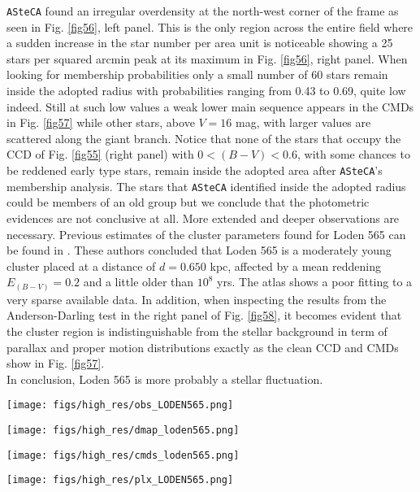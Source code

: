 \documentclass{aa}
\begin{document}
\texttt{ASteCA} found an irregular overdensity at the north-west corner of the
frame as seen in Fig. \ref{fig56}, left panel. This is the only region across the
entire field where a sudden increase in the star number per area unit is
noticeable showing a 25 stars per squared arcmin peak at its maximum in Fig. 
\ref{fig56}, right panel.
When looking for membership probabilities only a small number of 60 stars remain
inside the adopted radius with probabilities ranging from 0.43 to 0.69, quite
low indeed. Still at such low values a weak lower main sequence appears in the
CMDs in Fig. \ref{fig57} while other stars, above $V = 16$ mag, with larger
values are scattered along the giant branch. Notice that none of the stars that
occupy the CCD of Fig. \ref{fig55} (right panel) with $0<(B-V)<0.6$, with some
chances to be reddened early type stars, remain inside the adopted area after 
\texttt{ASteCA}'s membership analysis. The stars that \texttt{ASteCA}
identified inside the adopted radius could be members of an old group but we
conclude that the photometric evidences are not conclusive at all. More extended
and deeper observations are necessary. Previous estimates of the cluster
parameters found for Loden 565 can be found in \cite{Kharchenko_2005}.
These authors concluded that Loden 565 is a moderately young cluster placed at a
distance of $d = 0.650$ kpc, affected by a mean reddening $E_{(B-V)}= 0.2$ and
a little older than $10^8$ yrs. The \cite{Kharchenko_2005} atlas shows a
poor fitting to a very sparse available data. In addition, when inspecting the
results from the Anderson-Darling test in the right panel of Fig. \ref{fig58}, it
becomes evident that the cluster region is indistinguishable from the stellar
background in term of parallax and proper motion distributions exactly as the
clean CCD and CMDs show in Fig. \ref{fig57}.\\

In conclusion, Loden 565 is more probably a stellar fluctuation.

\begin{figure*}[ht]
    \centering
    \texttt{[image: figs/high\_res/obs\_LODEN565.png]}
    \caption{Idem Fig. \ref{fig3} for Loden 565.}
    \label{fig55}
\end{figure*}
\begin{figure*}[ht]
    \centering
    \texttt{[image: figs/high\_res/dmap\_loden565.png]}
    \caption{Idem Fig. \ref{fig4} for Loden 565.}
    \label{fig56}
\end{figure*}
\begin{figure*}[ht]
    \centering
    \texttt{[image: figs/high\_res/cmds\_loden565.png]}
    \caption{Idem Fig. \ref{fig5} for Loden 565.}
    \label{fig57}
\end{figure*}
\begin{figure*}[ht]
    \centering
    \texttt{[image: figs/high\_res/plx\_LODEN565.png]}
    \caption{Idem Fig. \ref{fig6} for Loden 565.}
    \label{fig58}
\end{figure*}
\end{document}
